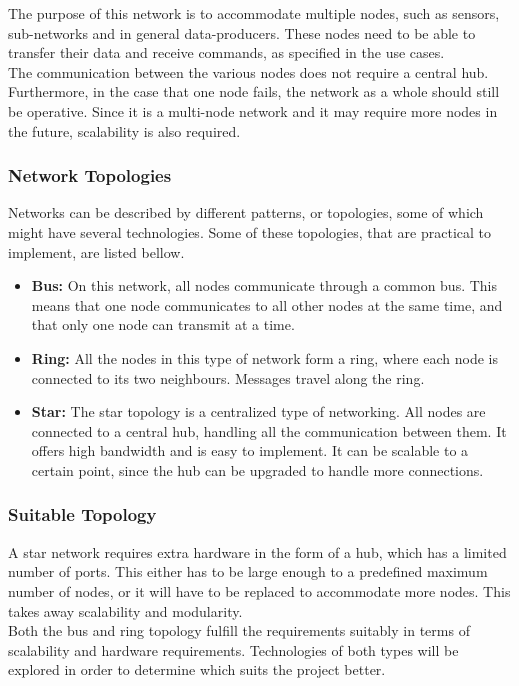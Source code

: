 The purpose of this network is to accommodate multiple nodes, such as sensors, sub-networks and in general data-producers.
These nodes need to be able to transfer their data and receive commands, as specified in the use cases.
\\
The communication between the various nodes does not require a central hub.
Furthermore, in the case that one node fails, the network as a whole should still be operative.
Since it is a multi-node network and it may require more nodes in the future, scalability is also required.

\subsubsection*{Network Topologies}
Networks can be described by different patterns, or topologies, some of which might have several technologies.
Some of these topologies, that are practical to implement, are listed bellow.
\begin{itemize}
\item \textbf{Bus:}
On this network, all nodes communicate through a common bus. 
This means that one node communicates to all other nodes at the same time, and that only one node can transmit at a time.
\item \textbf{Ring:} All the nodes in this type of network form a ring, where each node is connected to its two neighbours.
Messages travel along the ring.
\item \textbf{Star:} The star topology is a centralized type of networking.
All nodes are connected to a central hub, handling all the communication between them.
It offers high bandwidth and is easy to implement.
It can be scalable to a certain point, since the hub can be upgraded to handle more connections.
\end{itemize}

\subsubsection*{Suitable Topology}
A star network requires extra hardware in the form of a hub, which has a limited number of ports. 
This either has to be large enough to a predefined maximum number of nodes, or it will have to be replaced to accommodate more nodes.
This takes away scalability and modularity.\\

Both the bus and ring topology fulfill the requirements suitably in terms of scalability and hardware requirements.
Technologies of both types will be explored in order to determine which suits the project better.

